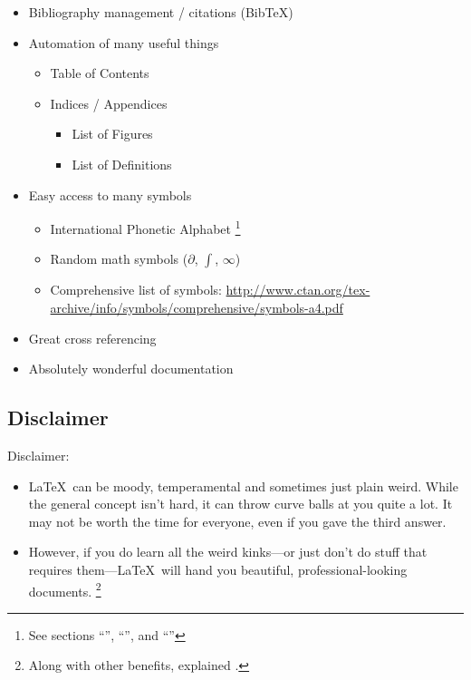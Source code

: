 \documentclass{beamer}                  %
\newcommand{\srule}{
	\rule{\textwidth}{1pt}\\
}
\newlength{\subsecwidth}
\newenvironment{slide}{
	\begin{frame} %
	\settowidth{\subsecwidth}{\insertsubsection} %
	\ifthenelse{\dimtest{\subsecwidth}{<}{1pt}}{ %
		\frametitle{\insertsection\\             %
		\vspace{-1ex}                            %
		\color{fore}\srule                       %
		\par                                     %
		\vspace{-3ex}                            %
		}
	}{                                           %
		\frametitle{\insertsection\ -- \insertsubsection\\ %
		\vspace{-1ex}                            %
		\color{fore}\srule                       %
		\par                                     %
		\vspace{-3ex}                            %
		}
	}
	\Large                                       %
}{
	\end{frame}
}
\begin{document}
\begin{slide}
	\begin{itemize}
		\item Bibliography management / citations (Bib\TeX)
		\item Automation of many useful things
		\begin{itemize}
			\item Table of Contents
			\item Indices / Appendices
			\begin{itemize}
				\item List of Figures
				\item List of Definitions
			\end{itemize}
		\end{itemize}
		\item Easy access to many symbols
		\begin{itemize}
			\item International Phonetic Alphabet
			\footnote{See sections ``'', ``'',
			and ``''}
			\item Random math symbols ($\partial$, $\int$, $\infty$)
			\item Comprehensive list of symbols:
			\url{http://www.ctan.org/tex-archive/info/symbols/comprehensive/symbols-a4.pdf}
		\end{itemize}
		\item Great cross referencing\label{cross}
		\item Absolutely wonderful documentation
	\end{itemize}
\end{slide}

\subsection{Disclaimer} %

\begin{slide}
	Disclaimer:
	\begin{itemize}
		\item \LaTeX\ can be moody, temperamental and sometimes just plain
		weird.  While the general concept isn't hard, it can throw curve balls
		at you quite a lot.  It may not be worth the time for everyone, even if
		you gave the third answer.
		\item However, if you do learn all the weird kinks---or just don't do
		stuff that requires them---\LaTeX\ will hand you beautiful,
		professional-looking documents.
		\footnote{Along with other benefits, explained .}
	\end{itemize}
\end{slide}
\end{document}
